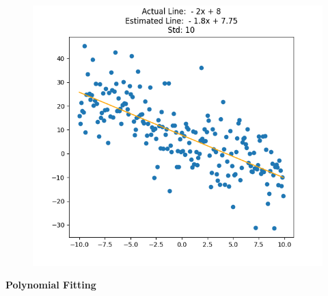 \documentclass[12pt]{article}
\begin{document}
\begin{figure}[H]
\includegraphics[scale=0.33]{line3.png}  
\end{figure}
\newpage
\textbf{Polynomial Fitting}
\end{document}
